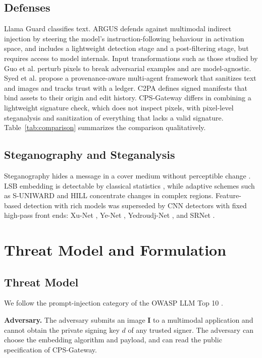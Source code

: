 \documentclass[conference]{IEEEtran}
\begin{document}
\subsection{Defenses}
Llama Guard \cite{inan2023llama} classifies text. ARGUS \cite{lu2024argus} defends against multimodal indirect injection by steering the model's instruction-following behaviour in activation space, and includes a lightweight detection stage and a post-filtering stage, but requires access to model internals. Input transformations such as those studied by Guo et al. \cite{guo2018countering} perturb pixels to break adversarial examples and are model-agnostic. Syed et al. \cite{syed2025toward} propose a provenance-aware multi-agent framework that sanitizes text and images and tracks trust with a ledger. C2PA \cite{c2pa2023spec} defines signed manifests that bind assets to their origin and edit history. CPS-Gateway differs in combining a lightweight signature check, which does not inspect pixels, with pixel-level steganalysis and sanitization of everything that lacks a valid signature. Table~\ref{tab:comparison} summarizes the comparison qualitatively.

\subsection{Steganography and Steganalysis}
Steganography hides a message in a cover medium without perceptible change \cite{johnson1998exploring}. LSB embedding is detectable by classical statistics \cite{fridrich2001detecting}, while adaptive schemes such as S-UNIWARD \cite{holub2014universal} and HILL \cite{li2014new} concentrate changes in complex regions. Feature-based detection with rich models \cite{fridrich2012rich} was superseded by CNN detectors with fixed high-pass front ends: Xu-Net \cite{xu2016structural}, Ye-Net \cite{ye2017deep}, Yedroudj-Net \cite{yedroudj2018yedroudj}, and SRNet \cite{boroumand2019deep}.

\section{Threat Model and Formulation}
\label{sec:threat_model}

\subsection{Threat Model}
We follow the prompt-injection category of the OWASP LLM Top 10 \cite{owasp2023top10}.

\textbf{Adversary.} The adversary submits an image $\mathbf{I}$ to a multimodal application and cannot obtain the private signing key $d$ of any trusted signer. The adversary can choose the embedding algorithm and payload, and can read the public specification of CPS-Gateway.
\end{document}
